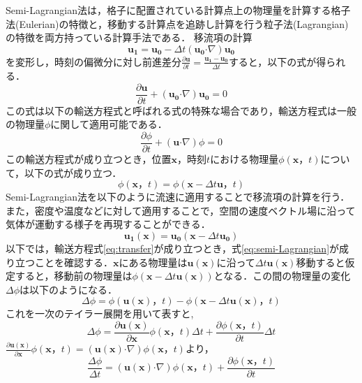 \documentclass[a4j,12pt]{jreport}
\begin{document}
Semi-Lagrangian法は，格子に配置されている計算点上の物理量を計算する格子法(Eulerian)の特徴と，移動する計算点を追跡し計算を行う粒子法(Lagrangian)の特徴を両方持っている計算手法である．
移流項の計算$$\bm{u_1} = \bm{u_0}  - \varDelta t (\bm{u_0}  \boldsymbol{\cdot}\nabla) \bm{u_0}$$を変形し，時刻の偏微分に対し前進差分$\frac{\partial \bm{u}}{\partial t} = \frac{\bm{u_1} - \bm{u_0}}{ \varDelta t }$すると，以下の式が得られる．
\[
\frac{\partial \bm{u}}{\partial t}   +(\bm{u_0}  \boldsymbol{\cdot}\nabla) \bm{u_0} = 0
\]
この式は以下の輸送方程式と呼ばれる式の特殊な場合であり，輸送方程式は一般の物理量$\phi$に関して適用可能である．
\begin{equation}\label{eq:transfer}
	\frac{\partial {\phi}}{\partial t}  +(\bm{u}  \boldsymbol{\cdot}\nabla) {\phi} = 0
\end{equation} 
この輸送方程式が成り立つとき，位置$\bm{x}$，時刻$t$における物理量$\phi(\bm{x}，t)$について，以下の式が成り立つ．
\begin{equation}\label{eq:semi-Lagrangian}
	{\phi}(\bm{x}，t) = {\phi}(\bm{x}  - \varDelta t \bm{u}，t)
\end{equation} 
Semi-Lagrangian法を以下のように流速に適用することで移流項の計算を行う．また，密度や温度などに対して適用することで，空間の速度ベクトル場に沿って気体が運動する様子を再現することができる．
\[
	\bm{u_1}(\bm{x}) = \bm{u_0}(\bm{x}  - \varDelta t \bm{u_0})
\]
以下では，輸送方程式\ref{eq:transfer}が成り立つとき，式\ref{eq:semi-Lagrangian}が成り立つことを確認する．$\bm{x}$にある物理量は$\bm{u} (\bm{x}) $に沿って$\varDelta t\bm{u} (\bm{x})$移動すると仮定すると，移動前の物理量は$\phi(\bm{x} -  \varDelta t\bm{u} (\bm{x}))$となる．この間の物理量の変化$\varDelta {\phi}$は以下のようになる．
\[
\varDelta \phi = \phi( \bm{u} (\bm{x})，t) - \phi (\bm{x} - \varDelta t\bm{u} (\bm{x})，t)
\]
これを一次のテイラー展開を用いて表すと,
\[
\varDelta \phi   = \frac{\partial \bm{u} (\bm{x}) }{\partial \bm{x}}\phi (\bm{x}，t) \varDelta t + \frac{\partial \phi (\bm{x}，t) }{\partial t}\varDelta t
\]
$\frac{\partial \bm{u} (\bm{x}) }{\partial \bm{x}}\phi (\bm{x}，t)= (\bm{u}(\bm{x}) \boldsymbol{\cdot}\nabla)\phi(\bm{x}，t)$より，
\[
 \frac{\varDelta \phi}{\varDelta t} =  (\bm{u}(\bm{x})\boldsymbol{\cdot}\nabla) \phi(\bm{x}，t) + \frac{\partial \phi(\bm{x}，t) }{\partial t}
 \]
 
\end{document}
